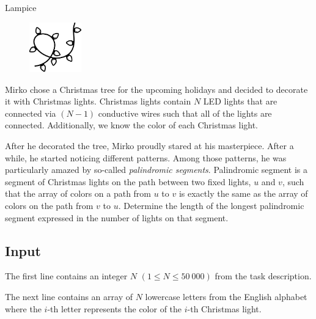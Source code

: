 \begin{statement}[
  problempoints=110,
  timelimit=5 seconds,
  memorylimit=512 MiB,
]{Lampice}

\setlength\intextsep{-0.1cm}
\begin{figure}
\centering
\includegraphics[width=0.2\textwidth]{img/lampice.png}
\end{figure}

Mirko chose a Christmas tree for the upcoming holidays and decided to decorate
it with Christmas lights. Christmas lights contain $N$ LED lights that are
connected via $(N-1)$ conductive wires such that all of the lights are connected.
Additionally, we know the color of each Christmas light.

After he decorated the tree, Mirko proudly stared at his masterpiece. After a
while, he started noticing different patterns. Among those patterns, he was
particularly amazed by so-called \textit{palindromic segments}. Palindromic
segment is a segment of Christmas lights on the path between two fixed lights,
$u$ and $v$, such that the array of colors on a path from $u$ to $v$ is exactly
the same as the array of colors on the path from $v$ to $u$.
Determine the length of the longest palindromic segment
expressed in the number of lights on that segment.


\subsection*{Input}
The first line contains an integer $N$ $(1 \le N \le 50\ 000)$ from the task
description.

The next line contains an array of $N$ lowercase letters from the English
alphabet where the $i$-th letter represents the color of the $i$-th Christmas
light.


\end{statement}
